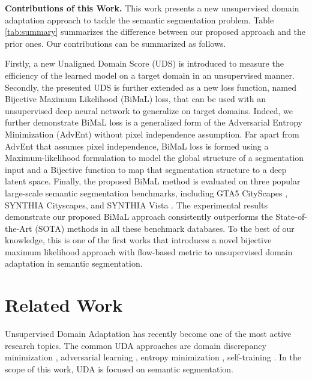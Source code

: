 \documentclass[10pt,twocolumn,letterpaper]{article}
\begin{document}
\noindent
\textbf{Contributions of this Work. }
This work presents a new unsupervised domain adaptation approach to tackle the semantic segmentation problem. Table \ref{tab:summary} summarizes the difference between our proposed approach and the prior ones. Our contributions can be summarized as follows.

Firstly, a new Unaligned Domain Score (UDS) is introduced to measure the efficiency of the learned model on a target domain in an unsupervised manner.
Secondly, the presented UDS is further extended as a new loss function, named Bijective Maximum Likelihood (BiMaL) loss, that can be used with an unsupervised deep neural network to generalize on target domains. Indeed, we further demonstrate BiMaL loss is a generalized form of the Adversarial Entropy Minimization (AdvEnt) \cite{vu2019advent} without pixel independence assumption. 
Far apart from AdvEnt that assumes pixel independence, BiMaL loss is formed using a Maximum-likelihood formulation to model the global structure of a segmentation input and a Bijective function to map that segmentation structure to a deep latent space.
Finally, the proposed BiMaL method is evaluated on three popular large-scale semantic segmentation benchmarks, including GTA5 \cite{Richter_2016_ECCV}  CityScapes \cite{cordts2016cityscapes}, SYNTHIA \cite{Ros_2016_CVPR}  Cityscapes, and SYNTHIA  Vista \cite{MVD2017}. The experimental results demonstrate our proposed BiMaL approach consistently outperforms the State-of-the-Art (SOTA) methods \cite{chen2018road, pan2020unsupervised, tsai2018learning, vu2019advent, vu2019dada} in all these benchmark databases.
To the best of our knowledge, this is one of the first works that introduces a novel bijective maximum likelihood approach with flow-based metric to unsupervised domain adaptation in semantic segmentation.







\section{Related Work}

Unsupervised Domain Adaptation has recently become one of the most active research topics. The common UDA approaches are domain discrepancy minimization \cite{ganin2015unsupervised, long2015learning, tzeng2017adversarial}, adversarial learning \cite{chen2018road,chen2017no, hoffman18a, hoffman2016fcns, hong2018CVPR, tsai2018learning}, entropy minimization \cite{murez2018CVPR, pan2020unsupervised, vu2019advent, zhu2017unpaired}, self-training \cite{zou2018unsupervised}. In the scope of this work, UDA is focused on semantic segmentation.
\end{document}
